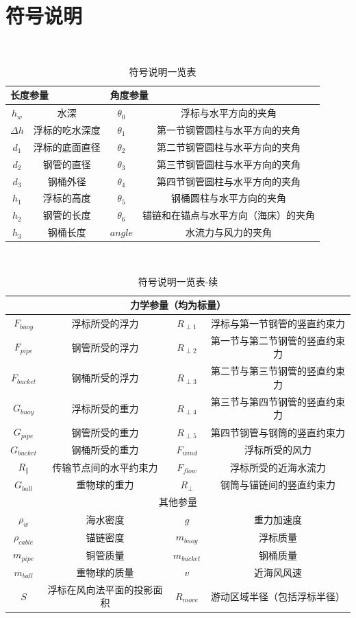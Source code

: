 \documentclass[a4paper,12pt]{ctexart}
\begin{document}
\section{符号说明}
\begin{table}[!h]
\caption{符号说明一览表}
\centering
\ \\
\begin{tabular}{cccc}
\hline \hline
\multicolumn{2}{l}{长度参量}&\multicolumn{2}{l}{角度参量}\\
\hline
$h_w$ & 水深 & $\theta_0$  &浮标与水平方向的夹角\\
$\Delta h$ & 浮标的吃水深度 &  $\theta_1$ &第一节钢管圆柱与水平方向的夹角\\
$d_1$ & 浮标的底面直径 & $\theta_2$ &第二节钢管圆柱与水平方向的夹角\\
$d_2$ & 钢管的直径 &  $\theta_3$& 第三节钢管圆柱与水平方向的夹角\\
$d_3$ & 钢桶外径 & $\theta_4$ &第四节钢管圆柱与水平方向的夹角\\
$h_1$ & 浮标的高度 & $\theta_5$ & 钢桶圆柱与水平方向的夹角\\
$h_2$ & 钢管的长度 & $\theta_6$ &锚链和在锚点与水平方向（海床）的夹角\\
$h_3$ & 钢桶长度 &$angle$ &水流力与风力的夹角 \\
\hline \hline
\end{tabular}
\end{table}
\begin{table}[!h]
\caption{符号说明一览表-续}
\centering
\ \\
\begin{tabular}{cccc}
\hline \hline
\multicolumn{4}{c}{力学参量（均为标量）}\\
\hline
$F_{buoy}$ & 浮标所受的浮力 & $R_{\perp1}$ &浮标与第一节钢管的竖直约束力 \\
$F_{pipe}$ & 钢管所受的浮力 & $R_{\perp2}$ &第一节与第二节钢管的竖直约束力 \\
$F_{bucket}$ & 钢桶所受的浮力 & $R_{\perp3}$ &第二节与第三节钢管的竖直约束力 \\
$G_{buoy}$ & 浮标所受的重力 & $R_{\perp4}$ &第三节与第四节钢管的竖直约束力 \\
$G_{pipe}$ & 钢管所受的重力 & $R_{\perp5}$ &第四节钢管与钢筒的竖直约束力 \\
$G_{bucket}$ & 钢桶所受的重力 & $F_{wind}$ & 浮标所受的风力 \\
$R_{\parallel}$ & 传输节点间的水平约束力& $F_{flow}$&浮标所受的近海水流力\\
$G_{ball}$ &重物球的重力& $R_{\perp}$ &钢筒与锚链间的竖直约束力 \\
\hline
\multicolumn{4}{c}{其他参量}\\
\hline
$\rho_w$ &海水密度&$g$&重力加速度 \\
$\rho_{cable}$&锚链密度& $m_{buoy}$&浮标质量\\
$m_{pipe}$&铜管质量&$m_{bucket}$&钢桶质量\\
$m_{ball}$&重物球的质量&$v$&近海风风速\\
$S$&浮标在风向法平面的投影面积&$R_{move}$&游动区域半径（包括浮标半径）\\
\hline \hline
\end{tabular}
\end{table}
\end{document}
